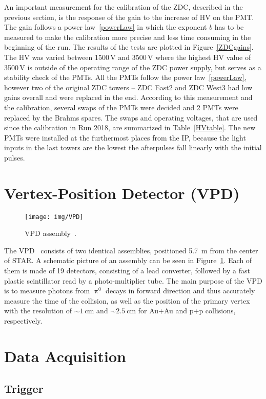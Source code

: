 An important measurement for the calibration of the ZDC, described in the previous section, is the response of the gain to the increase of HV on the PMT\@. The gain follows a power law~\eqref{powerLaw} in which the exponent $b$ has to be measured to make the calibration more precise and less time consuming in the beginning of the run. The results of the tests are plotted in Figure~\ref{ZDCgains}\@. The HV was varied between 1500$\,$V and 3500$\,$V where the highest HV value of 3500$\,$V is outside of the operating range of the ZDC power supply, but serves as a stability check of the PMTs. All the PMTs follow the power law~\eqref{powerLaw}, however two of the original ZDC towers -- ZDC East2 and ZDC West3 had low gains overall and were replaced in the end. According to this measurement and the calibration, several swaps of the PMTs were decided and 2 PMTs were replaced by the Brahms spares. The swaps and operating voltages, that are used since the calibration in Run 2018, are summarized in Table~\ref{HVtable}\@. The new PMTs were installed at the furthermost places from the IP, because the light inputs in the last towers are the lowest the afterpulses fall linearly with the initial pulses. 






\section{Vertex-Position Detector (VPD)\label{VPD}}

\begin{figure}[!htb]
\begin{center}
 \texttt{[image: img/VPD]}\\
\end{center}
\caption{\label{VPDassembly}VPD assembly~\cite{VPD}.}
\end{figure}

The VPD~\cite{VPD} consists of two identical assemblies, positioned \SI{5.7}{\metre} from the center of STAR\@. A schematic 
picture of an assembly can be seen in Figure~\ref{VPDassembly}. Each of them is made of 19 detectors, consisting of a lead 
converter, followed by a fast plastic scintillator read by a photo-multiplier tube. The main purpose of the VPD is to measure 
photons from $\uppi^0$ decays in forward direction and thus accurately measure the time of the collision, as well as 
the position of the primary vertex with the resolution of $\sim \SI{1}{\centi\metre}$ and  $\sim \SI{2.5}{\centi\metre}$ 
for Au+Au and p+p collisions, respectively.

\section{Data Acquisition}
\subsection{Trigger}

